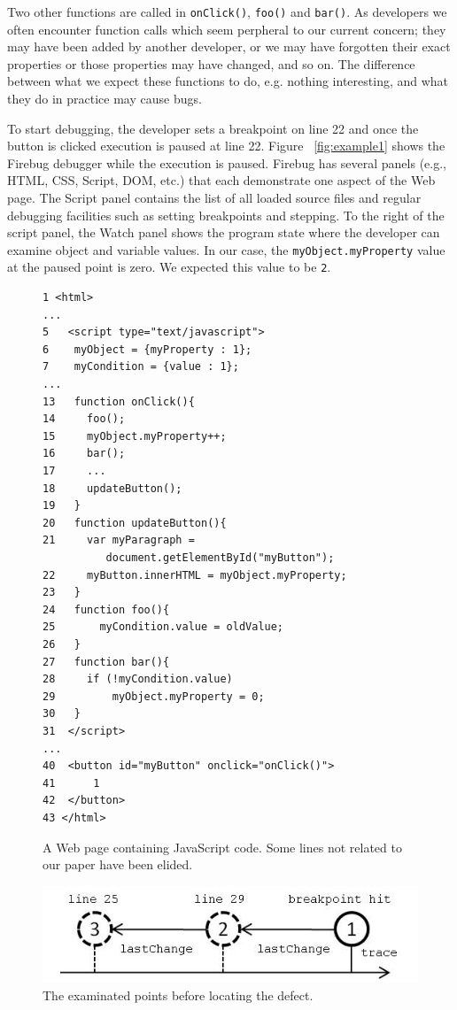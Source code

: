 \documentclass[preprint]{sigplanconf}
\begin{document}
Two other functions are called in \texttt{onClick()}, \texttt{foo()}
and \texttt{bar()}. As developers we often encounter function calls
which seem perpheral to our current concern; they may have been added
by another developer, or we may have forgotten their exact properties
or those properties may have changed, and so on. The difference
between what we expect these functions to do, e.g. nothing
interesting, and what they do in practice may cause bugs.

To start debugging, the developer sets a breakpoint
on line 22 and once the button is clicked execution is paused at line
22. Figure ~\ref{fig:example1} shows the Firebug debugger while the
execution is paused. Firebug has several panels (e.g., HTML, CSS,
Script, DOM, etc.) that each demonstrate one aspect of the Web page.
The Script panel contains the list of all loaded source
files and regular debugging facilities such as setting breakpoints and
stepping. To the right of the script panel, the Watch panel shows the program state
where the developer can examine object and variable values. In our case, the
\texttt{myObject.myProperty} value at the paused point is zero. We expected this value to be \texttt{2}.

\begin{figure}[htp]
\begin{verbatim}
1 <html>
...
5   <script type="text/javascript">
6    myObject = {myProperty : 1};
7    myCondition = {value : 1};
...
13   function onClick(){
14     foo();
15     myObject.myProperty++;
16     bar();
17     ...
18     updateButton();
19   }
20   function updateButton(){
21     var myParagraph =
          document.getElementById("myButton");
22     myButton.innerHTML = myObject.myProperty;
23   }   
24   function foo(){
25  	 myCondition.value = oldValue;
26   }  
27   function bar(){ 
28     if (!myCondition.value)
29         myObject.myProperty = 0;
30   }
31  </script> 
...
40  <button id="myButton" onclick="onClick()">
41  	1 
42  </button>
43 </html>
\end{verbatim}
\caption{A Web page containing JavaScript code. Some lines not related to our paper have been elided.}
\label{fig:js-code}
\end{figure}


\begin{figure}[htp]
\includegraphics{5-example-points.jpg}
\caption{The examinated points before locating the defect.}
\label{fig:example-points}
\end{figure}
\end{document}
